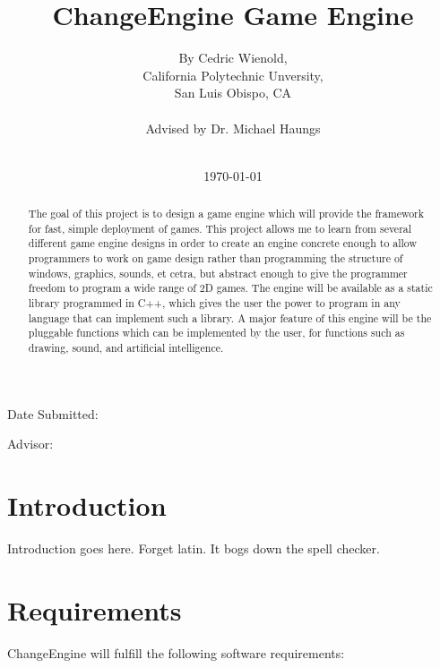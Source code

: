 \documentclass[12pt]{article}
\title{ChangeEngine Game Engine}
\author{By Cedric Wienold,\\
California Polytechnic Unversity,\\
San Luis Obispo, CA\\\\
Advised by Dr. Michael Haungs\\\\}
\date{\today}
\begin{document}
  
  \maketitle

  \thispagestyle{empty}

  \vfill

  \begin{flushright}
    
    Date Submitted:\makebox[1.5in]{\hrulefill}

    \vspace{12pt}
    
    Advisor:\makebox[1.5in]{\hrulefill}
  \end{flushright}

  \newpage
  

  \tableofcontents

  \newpage

  \begin{abstract}
    The goal of this project is to design a game engine which will provide the framework for fast, simple deployment of games. This project allows me to learn from several different game engine designs in order to create an engine concrete enough to allow programmers to work on game design rather than programming the structure of windows, graphics, sounds, et cetra, but abstract enough to give the programmer freedom to program a wide range of 2D games. The engine will be available as a static library programmed in C++, which gives the user the power to program in any language that can implement such a library. A major feature of this engine will be the pluggable functions which can be implemented by the user, for functions such as drawing, sound, and artificial intelligence.
  \end{abstract}
  
  \newpage
  

  \section{Introduction}
    Introduction goes here. Forget latin. It bogs down the spell checker.

  \section{Requirements}
    ChangeEngine will fulfill the following software requirements:
\end{document}
